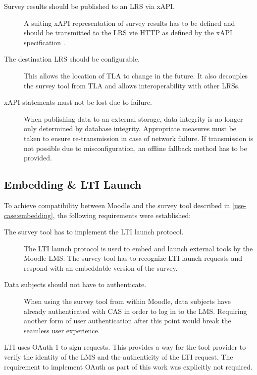  \begin{description}
     \item[Survey results should be published to an LRS via xAPI.] A suiting xAPI 
     representation of survey results has to be defined and should be transmitted
     to the LRS vie HTTP as defined by the xAPI specification \cite{xapi-spec}.
     \item[The destination LRS should be configurable.] This allows the location
     of TLA to change in the future. It also decouples the survey tool from TLA 
     and allows interoperability with other LRSs.
     \item[xAPI statements must not be lost due to failure.] When publishing data
     to an external storage, data integrity is no longer only determined by
     database integrity. Appropriate measures must be taken to ensure 
     re-transmission in case of network failure. If transmission is not possible
     due to misconfiguration, an offline fallback method has to be provided.
 \end{description}

\subsection{Embedding \& LTI Launch}
 To achieve compatibility between Moodle and the survey tool described in \ref{use-case:embedding}, 
 the following requirements were established:

 \begin{description}
     \item[The survey tool has to implement the LTI launch protocol.] 
     The LTI launch protocol is used to embed and launch external tools 
     by the Moodle LMS. The survey tool has to recognize LTI launch requests
     and respond with an embeddable version of the survey.
     \item[Data subjects should not have to authenticate.] When using the survey tool
     from within Moodle, data subjects have already authenticated with CAS in order
     to log in to the LMS. Requiring another form of user authentication after
     this point would break the seamless user experience.
 \end{description}

 LTI uses OAuth 1 to sign requests. This provides a way for the tool provider
 to verify the identity of the LMS and the authenticity of the LTI request.
 The requirement to implement OAuth as part of this work was explicitly not required.


